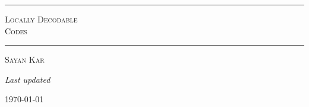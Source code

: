 %	
%	
%	
%	
%	
%	
%	

\begin{titlepage}
	\thispagestyle{empty}
	
	\begin{center}
		
		\vspace*{3cm}
		
			\rule{0.85\textwidth}{0.6pt}
		
		\vspace{1.5cm}
		
		
		{\fontsize{42}{50}\selectfont
			\textsc{Locally Decodable\\[0.3em]
				Codes}\par}
		
		\vspace{1.2cm}
		
		\rule{0.85\textwidth}{0.6pt}
		
		\vspace{1.5cm}
		
		{\Large\textsc{Sayan Kar}\par}
		
	
		
		\vfill
		
		{\large
			\textit{Last updated}\par}
		
		\vspace{0.3cm}
		
		{\Large \today\par}
		
		\vspace*{1cm}
		
	\end{center}
\end{titlepage}